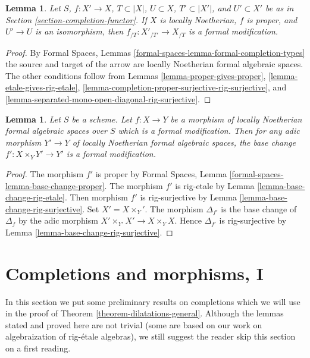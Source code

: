 \documentclass{stacks-project}
\theoremstyle{plain}
\newtheorem{lemma}[subsection]{Lemma}
\theoremstyle{definition}
\theoremstyle{remark}
\numberwithin{equation}{subsection}
\begin{document}
\begin{lemma}
\label{lemma-modification-gives-formal-modification}
Let $S$, $f : X' \to X$, $T \subset |X|$, $U \subset X$,
$T' \subset |X'|$, and $U' \subset X'$ be as in
Section \ref{section-completion-functor}.
If $X$ is locally Noetherian, $f$ is proper, and $U' \to U$ is an isomorphism,
then $f_{/T} : X'_{/T'} \to X_{/T}$ is a formal modification.
\end{lemma}

\begin{proof}
By Formal Spaces, Lemmas \ref{formal-spaces-lemma-formal-completion-types}
the source and target of the arrow are locally Noetherian
formal algebraic spaces.
The other conditions follow from
Lemmas \ref{lemma-proper-gives-proper},
\ref{lemma-etale-gives-rig-etale},
\ref{lemma-completion-proper-surjective-rig-surjective}, and
\ref{lemma-separated-mono-open-diagonal-rig-surjective}.
\end{proof}

\begin{lemma}
\label{lemma-base-change-formal-modification}
Let $S$ be a scheme. Let $f : X \to Y$ be a morphism of locally Noetherian
formal algebraic spaces over $S$ which is a formal modification.
Then for any adic morphism $Y' \to Y$ of locally Noetherian formal
algebraic spaces, the base change $f' : X \times_Y Y' \to Y'$ is
a formal modification.
\end{lemma}

\begin{proof}
The morphism $f'$ is proper by
Formal Spaces, Lemma \ref{formal-spaces-lemma-base-change-proper}.
The morphism $f'$ is rig-etale by
Lemma \ref{lemma-base-change-rig-etale}.
Then morphism $f'$ is rig-surjective by
Lemma \ref{lemma-base-change-rig-surjective}. Set $X' = X \times_ Y'$.
The morphism $\Delta_{f'}$ is the base change of
$\Delta_f$ by the adic morphism $X' \times_{Y'} X' \to X \times_Y X$.
Hence $\Delta_{f'}$ is rig-surjective by
Lemma \ref{lemma-base-change-rig-surjective}.
\end{proof}









\section{Completions and morphisms, I}
\label{section-completion-and-morphisms}

\noindent
In this section we put some preliminary results on completions
which we will use in the proof of Theorem \ref{theorem-dilatations-general}.
Although the lemmas stated and proved here are not trivial
(some are based on our work on algebraization of rig-\'etale algebras),
we still suggest the reader skip this section on a first reading.
\end{document}
